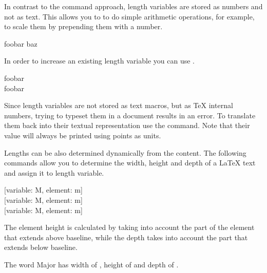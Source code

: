 In contrast to the command approach, length variables are stored as numbers and
not as text. This allows you to to do simple arithmetic operations, for
example, to scale them by prepending them with a number.
\begin{example}
\newlength{\mylength}
\setlength{\mylength}{2em}
foo\hspace{0.5\mylength}bar%
\hspace{2\mylength}baz
\end{example}
In order to increase an existing length variable you can use .
\begin{example}
\setlength{\mylength}{2em} %
foo\hspace{\mylength}bar\\
\addtolength{\mylength}{2em}
foo\hspace{\mylength}bar
\end{example}

Since length variables are not stored as text macros, but as \TeX{} internal
numbers, trying to typeset them in a document results in an error. To translate
them back into their textual representation use the  command. Note
that their value will always be printed using points as units.
\begin{chktexignore}  
\begin{example}
\setlength{\mylength}{1cm}
\the\mylength
\end{example}
\end{chktexignore}

Lengths can be also determined dynamically from the content. The following
commands allow you to determine the width, height and depth of a \LaTeX{} text
and assign it to length variable.
\begin{lscommand}
  [variable: M, element: m]\\
  [variable: M, element: m] \\
  [variable: M, element: m]
\end{lscommand}
The element height is calculated by taking into account the part of the element
that extends above baseline, while the depth takes into account the part that
extends below baseline.
\begin{example}[vertical_mode, examplewidth=0.85\linewidth]
\newlength{\myheight} 
\newlength{\mydepth} 
\newlength{\mywidth} \settowidth{\mywidth}{Major}
The word Major has width of \the\mywidth, height of
\the\myheight{} and depth of \the\mydepth.
\end{example}

